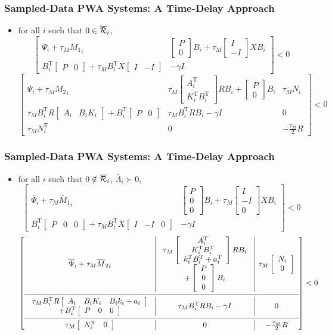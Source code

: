 \documentclass{beamer}
\newcommand{\TR}{\text{T}}
\newcommand{\RR}{{\cal R}}
\newcommand{\beq}{\begin{equation*}}
\newcommand{\eeq}{\end{equation*}}
\newcommand{\bmat}{\left[\begin{array}}
\newcommand{\emat}{\end{array}\right]}
\begin{document}
  \frame
  {  
    \frametitle{Sampled-Data PWA Systems: A Time-Delay Approach}
\begin{itemize}
\item for all $i$ such that $0\in\overline\RR_i$,
{\scriptsize 
\beq
\bmat{cc}\Psi_i+\tau_M {M_1}_i&\bmat{c}P\\0\emat B_i+\tau_M\bmat{c}I\\-I\emat X B_i\\B_i^\TR\bmat{cc}P&0\emat+\tau_M B_i^\TR X\bmat{cc}I&-I\emat &-\gamma I\emat<0
\eeq
\beq
\bmat{ccc}\Psi_i+\tau_M {M_2}_i&\tau_M\bmat{c}A_i^\TR\\K_i^\TR B_i^\TR\emat R B_i+\bmat{c}P\\0\emat B_i&\tau_M N_i\\
\tau_M B_i^\TR R \bmat{cc} A_i & B_i K_i\emat+B_i^\TR\bmat{cc}P&0\emat&\tau_M B_i^\TR R B_i-\gamma I & 0\\
\tau_M N_i^\TR & 0 & -\frac{\tau_M}{2} R\emat<0
\eeq}
\end{itemize}
}

  \frame
  {  
    \frametitle{Sampled-Data PWA Systems: A Time-Delay Approach}
\begin{itemize}
\item for all $i$ such that $0\notin\overline\RR_i$, $\bar\Lambda_i\succ0$,
{\scriptsize 
\beq
\bmat{cc}\overline \Psi_i+\tau_M {\overline M_1}_i&\bmat{c}P\\0\\0\emat B_i+\tau_M\bmat{c}I\\-I\\0\emat X B_i\\B_i^\TR\bmat{ccc}P&0&0\emat+\tau_M B_i^\TR X\bmat{ccc}I&-I&0\emat&-\gamma I\emat<0
\eeq
\beq
\bmat{c|c|c}
\overline\Psi_i+\tau_M {\overline M_2}_i&\begin{array}{c}\tau_M\bmat{c}A_i^\TR\\K_i^\TR B_i^\TR\\k_i^\TR B_i^\TR +a_i^\TR\emat R B_i\\+\bmat{c}P\\0\\0\emat B_i\end{array}&\tau_M \bmat{c}N_i\\0\emat\\\noalign{\smallskip\hrule\smallskip}
\begin{array}{c}\tau_M B_i^\TR R \bmat{ccc} A_i & B_i K_i&B_i k_i+a_i \emat\\+B_i^\TR\bmat{ccc}P&0&0\emat\end{array} & \tau_M B_i^\TR R B_i-\gamma I & 0\\\noalign{\smallskip\hrule\smallskip}
\tau_M \bmat{cc}N_i^\TR&0\emat & 0 & -\frac{\tau_M}{2} R
\emat<0
\eeq}
\end{itemize}
}
\end{document}
